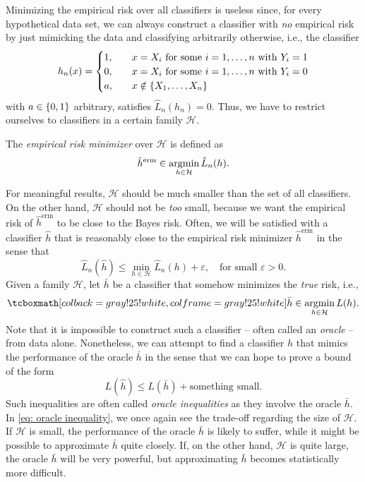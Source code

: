 Minimizing the empirical risk over all classifiers is useless since, for every hypothetical data set, we can always construct a classifier with \emph{no} empirical risk by just mimicking the data and classifying arbitrarily otherwise, i.e., the classifier
\[
    h_n(x) = \begin{cases}
        1, \quad &x = X_i \text{ for some } i = 1, \dots, n \text{ with } Y_i = 1 \\
        0, \quad &x = X_i \text{ for some } i = 1, \dots, n \text{ with } Y_i = 0 \\
        a, \quad &x \notin \left\{X_1, \dots, X_n\right\}
    \end{cases}
\]
with $a \in \left\{0, 1\right\}$ arbitrary, satisfies $\hat L_n(h_n) = 0$. Thus, we have to restrict ourselves to classifiers in a certain family $\mathcal{H}$.

\begin{definition}
The \emph{empirical risk minimizer} over $\mathcal{H}$ is defined as
\[
    \hat h^{\text{erm}} \in \operatorname*{argmin}_{h \in \mathcal{H}} \hat L_n(h).
\]
\end{definition}

For meaningful results, $\mathcal{H}$ should be much smaller than the set of all classifiers. On the other hand, $\mathcal{H}$ should not be \emph{too} small, because we want the empirical risk of $\hat h^{\text{erm}}$ to be close to the Bayes risk. Often, we will be satisfied with a classifier $\hat h$ that is reasonably close to the empirical risk minimizer $\hat h^{\text{erm}}$ in the sense that
\[
    \hat L_n(\hat h) \leq \min_{h \in \mathcal{H}} \hat L_n(h) + \varepsilon, \quad \text{for small } \varepsilon > 0.
\]
Given a family $\mathcal{H}$, let $\bar h$ be a classifier that somehow minimizes the \emph{true} risk, i.e.,
\[
    \highlightMath{
        \bar h \in \argmin_{h\in \mathcal{H}} L(h).
    }
\]
Note that it is impossible to construct such a classifier -- often called an \emph{oracle} -- from data alone. Nonetheless, we can attempt to find a classifier $\hat h$ that mimics the performance of the oracle $\bar h$ in the sense that we can hope to prove a bound of the form
\begin{equation}
    \label{eq: oracle inequality}
    L(\hat h) \leq L(\bar h) + \text{something small}.
\end{equation}
Such inequalities are often called \emph{oracle inequalities} as they involve the oracle $\bar h$. In \eqref{eq: oracle inequality}, we once again see the trade-off regarding the size of $\mathcal{H}$. If $\mathcal{H}$ is small, the performance of the oracle $\bar h$ is likely to suffer, while it might be possible to approximate $\bar h$ quite closely. If, on the other hand, $\mathcal{H}$ is quite large, the oracle $\bar h$ will be very powerful, but approximating $\bar h$ becomes statistically more difficult.

